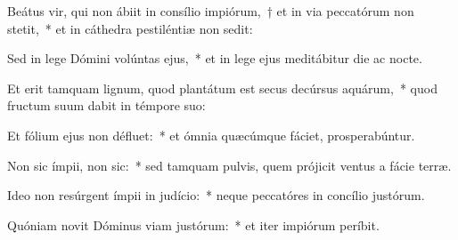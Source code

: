 \item Beátus vir, qui non ábiit in consílio impiórum,~† et in via peccatórum non stetit,~* et in cáthedra pestiléntiæ non sedit:

\item Sed in lege Dómini volúntas ejus,~* et in lege ejus meditábitur die ac nocte.

\item Et erit tamquam lignum, quod plantátum est secus decúrsus aquárum,~* quod fructum suum dabit in témpore suo:

\item Et fólium ejus non défluet:~* et ómnia quæcúmque fáciet, prosperabúntur.

\item Non sic ímpii, non sic:~* sed tamquam pulvis, quem prójicit ventus a fácie terræ.

\item Ideo non resúrgent ímpii in judício:~* neque peccatóres in concílio justórum.

\item Quóniam novit Dóminus viam justórum:~* et iter impiórum períbit.
